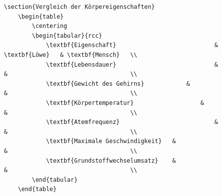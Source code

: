 \begin{frame}[fragile]
	\Code
	\begin{lstlisting}[tabsize= 2]
\section{Vergleich der Körpereigenschaften}
	\begin{table}
		\centering
		\begin{tabular}{rcc}
			\textbf{Eigenschaft}							&	\textbf{Löwe}	& \textbf{Mensch} 	\\ 
			\textbf{Lebensdauer} 							&								& 									\\ 
			\textbf{Gewicht des Gehirns}			&								& 									\\ 
			\textbf{Körpertemperatur}					&								& 									\\
			\textbf{Atemfrequenz}							&								& 									\\
			\textbf{Maximale Geschwindigkeit}	&								& 									\\ 
			\textbf{Grundstoffwechselumsatz}	&								& 									\\
		\end{tabular}
	\end{table}
	\end{lstlisting}
\end{frame}
